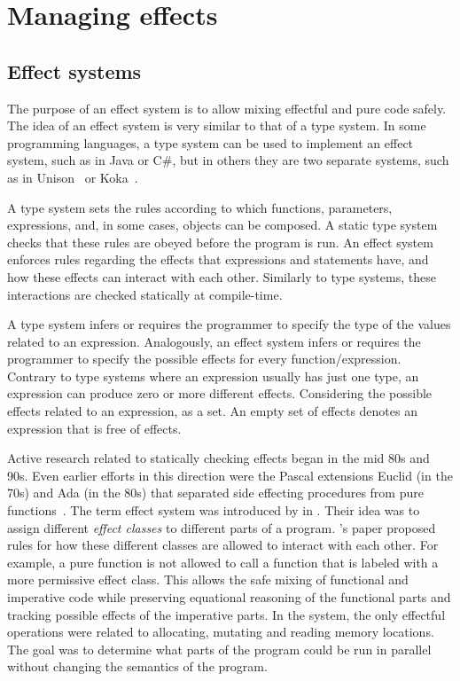 \chapter{Managing effects}

\section{Effect systems}\label{effects:effect-systems}
The purpose of an effect system is to allow mixing effectful and pure code safely. The idea of an effect system is very similar to that of a type system. In some programming languages, a type system can be used to implement an effect system, such as in Java or C\#, but in others they are two separate systems, such as in Unison~\cite{unison-lang} or Koka~\cite{koka-lang}.

A type system sets the rules according to which functions, parameters, expressions, and, in some cases, objects can be composed. A static type system checks that these rules are obeyed before the program is run. An effect system enforces rules regarding the effects that expressions and statements have, and how these effects can interact with each other. Similarly to type systems, these interactions are checked statically at compile-time.

A type system infers or requires the programmer to specify the type of the values related to an expression. Analogously, an effect system infers or requires the programmer to specify the possible effects for every function/expression. Contrary to type systems where an expression usually has just one type, an expression can produce zero or more different effects. Considering the possible effects related to an expression, as a set. An empty set of effects denotes an expression that is free of effects.

Active research related to statically checking effects began in the mid 80s and 90s. Even earlier efforts in this direction were the Pascal extensions Euclid (in the 70s) and Ada (in the 80s) that separated side effecting procedures from pure functions~\cite{real-prog-in-fp}. The term effect system was introduced by \textcite{intgr-fp-ip} in \citeyear{intgr-fp-ip}. Their idea was to assign different \emph{effect classes} to different parts of a program. \citeauthor{intgr-fp-ip}'s paper proposed rules for how these different classes are allowed to interact with each other. For example, a pure function is not allowed to call a function that is labeled with a more permissive effect class. This allows the safe mixing of functional and imperative code while preserving equational reasoning of the functional parts and tracking possible effects of the imperative parts. In the system, the only effectful operations were related to allocating, mutating and reading memory locations. The goal was to determine what parts of the program could be run in parallel without changing the semantics of the program.

